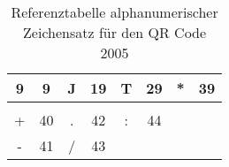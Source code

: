 \begin{appendix}
\begin{table}[htbp]
\begin{tabular}{cccccccc}
			\multicolumn{1}{|c|}{9}                & \multicolumn{1}{c|}{9}             & \multicolumn{1}{c|}{J}                & \multicolumn{1}{c|}{19}            & \multicolumn{1}{c|}{T}                & \multicolumn{1}{c|}{29}            & \multicolumn{1}{c|}{*}                & \multicolumn{1}{c|}{39}            \\ \hline
			&                                    &                                       &                                    &                                       &                                    &                                       &                                    \\ \hline
			\multicolumn{1}{|c|}{+}                & \multicolumn{1}{c|}{40}            & \multicolumn{1}{c|}{.}                & \multicolumn{1}{c|}{42}            & \multicolumn{1}{c|}{:}                & \multicolumn{1}{c|}{44}            & \multicolumn{1}{c|}{}                 & \multicolumn{1}{c|}{}              \\ \hline
			\multicolumn{1}{|c|}{-}                & \multicolumn{1}{c|}{41}            & \multicolumn{1}{c|}{/}                & \multicolumn{1}{c|}{43}            & \multicolumn{1}{c|}{}                 & \multicolumn{1}{c|}{}              & \multicolumn{1}{c|}{}                 & \multicolumn{1}{c|}{}              \\ \hline
		\end{tabular}
		\caption[Referenztabelle alphanumerischer Zeichensatz für den QR Code 2005]{Referenztabelle alphanumerischer Zeichensatz für den QR Code 2005\footnotemark}
		\label{tab:refalphanum}
	\end{table}

\end{appendix}
